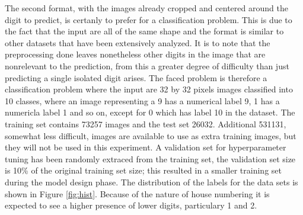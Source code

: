 \documentclass[12pt]{article}
\begin{document}
The second format, with the images already cropped and centered around the digit to predict, is certanly to prefer for a classification problem. This is due to the fact that the input are all of the same shape and the format is similar to other datasets that have been extensively analyzed. It is to note that the preprocessing done leaves nonetheless other digits in the image that are nonrelevant to the prediction, from this a greater degree of difficulty than just predicting a single isolated digit arises.
The faced problem is therefore a classification problem where the input are 32 by 32 pixels images classified into 10 classes, where an image representing a 9 has a numerical label 9, 1 has a numericla label 1 and so on, except for 0 which has label 10 in the dataset. The training set contains 73257 images and the test set 26032. Additional 531131, somewhat less difficult, images are available to use as extra training images, but they will not be used in this experiment. A validation set for hyperparameter tuning has been randomly extraced from the training set, the validation set size is 10\% of the original training set size; this resulted in a smaller training set during the model design phase.
The distribution of the labels for the data sets is shown in Figure \ref{fig:hist}. Because of the nature of house numbering it is expected to see a higher presence of lower digits, particulary 1 and 2.
\end{document}
